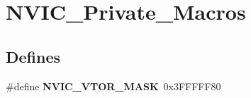\hypertarget{group___n_v_i_c___private___macros}{\section{\-N\-V\-I\-C\-\_\-\-Private\-\_\-\-Macros}
\label{group___n_v_i_c___private___macros}
}
\subsection*{\-Defines}
\begin{DoxyCompactItemize}
\item 
\hypertarget{group___n_v_i_c___private___macros_ga0ab4e3405db50c6913b786cf7da0c38e}{\#define {\bfseries \-N\-V\-I\-C\-\_\-\-V\-T\-O\-R\-\_\-\-M\-A\-S\-K}~0x3\-F\-F\-F\-F\-F80}\label{group___n_v_i_c___private___macros_ga0ab4e3405db50c6913b786cf7da0c38e}

\end{DoxyCompactItemize}
